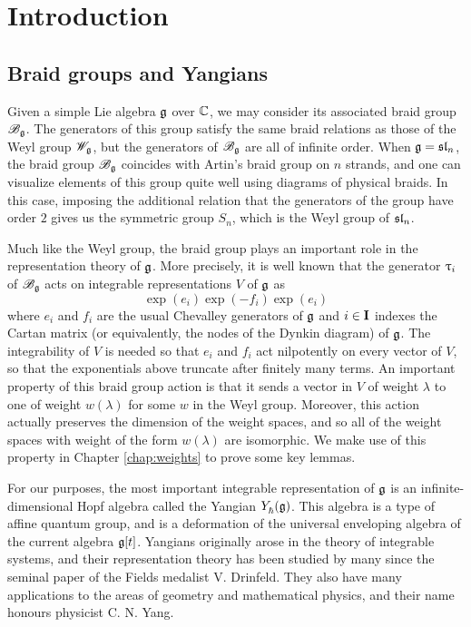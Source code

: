 \chapter{Introduction}

\section{Braid groups and Yangians}

Given a simple Lie algebra $\mathfrak{g}$ over $\mathbb{C}$, we may consider its associated braid group $\mathscr{B}_{\mathfrak{g}}$.
The generators of this group satisfy the same braid relations as those of the Weyl group $\mathscr{W}_{\mathfrak{g}}$, but the generators of $\mathscr{B}_{\mathfrak{g}}$ are all of infinite order.
When $\mathfrak{g} = \mathfrak{sl}_n$, the braid group $\mathscr{B}_{\mathfrak{g}}$ coincides with Artin's braid group on $n$ strands, and one can visualize elements of this group quite well using diagrams of physical braids.
In this case, imposing the additional relation that the generators of the group have order $2$ gives us the symmetric group $S_n$, which is the Weyl group of $\mathfrak{sl}_n$.

Much like the Weyl group, the braid group plays an important role in the representation theory of $\mathfrak{g}$.
More precisely, it is well known that the generator $\uptau_i$ of $\mathscr{B}_{\mathfrak{g}}$ acts on integrable representations $V$ of $\mathfrak{g}$ as
\[\exp(e_i)\exp(-f_i)\exp(e_i)\]
where $e_i$ and $f_i$ are the usual Chevalley generators of $\mathfrak{g}$ and $i\in\mathbf{I}$ indexes the Cartan matrix (or equivalently, the nodes of the Dynkin diagram) of $\mathfrak{g}$.
The integrability of $V$ is needed so that $e_i$ and $f_i$ act nilpotently on every vector of $V$, so that the exponentials above truncate after finitely many terms.
An important property of this braid group action is that it sends a vector in $V$ of weight $\lambda$ to one of weight $w(\lambda)$ for some $w$ in the Weyl group.
Moreover, this action actually preserves the dimension of the weight spaces, and so all of the weight spaces with weight of the form $w(\lambda)$ are isomorphic.
We make use of this property in Chapter \ref{chap:weights} to prove some key lemmas.

For our purposes, the most important integrable representation of $\mathfrak{g}$ is an infinite-dimensional Hopf algebra called the Yangian $Y_\hbar^{}(\mathfrak{g})$.
This algebra is a type of affine quantum group, and is a deformation of the universal enveloping algebra of the current algebra $\mathfrak{g}[t]$.
Yangians originally arose in the theory of integrable systems, and their representation theory has been studied by many since the seminal paper \cite{drinfeld_hopf_1985} of the Fields medalist V. Drinfeld.
They also have many applications to the areas of geometry and mathematical physics, and their name honours physicist C. N. Yang.

